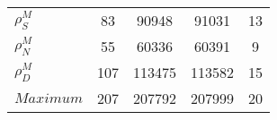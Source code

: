 \begin{center}
\begin{longtable}{lcccc}
$ {\rho^{M}_{S}}       $	 & 	                   83	 & 	                90948	 & 	                91031	 & 	                   13 \\ 
$ {\rho^{M}_{N}}       $	 & 	                   55	 & 	                60336	 & 	                60391	 & 	                    9 \\ 
$ {\rho^{M}_{D}}       $	 & 	                  107	 & 	               113475	 & 	               113582	 & 	                   15 \\ 
$Maximum               $	 & 	                  207	 & 	               207792	 & 	               207999	 & 	                   20 \\ 
\end{longtable}
 \end{center}
